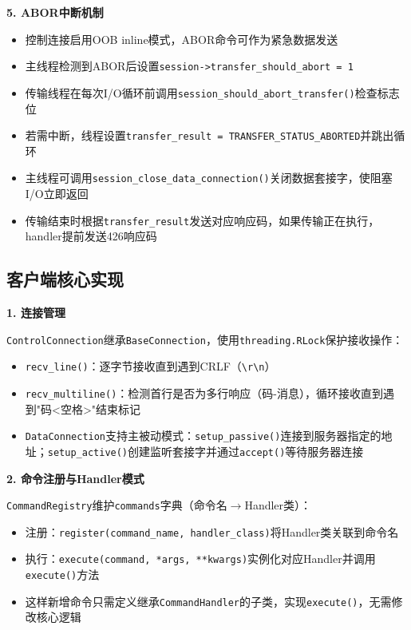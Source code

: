 \documentclass[11pt,a4paper]{article}
\begin{document}
\textbf{5. ABOR中断机制}

\begin{itemize}[itemsep=0pt]
    \item 控制连接启用OOB inline模式，ABOR命令可作为紧急数据发送
    \item 主线程检测到ABOR后设置\texttt{session->transfer\_should\_abort = 1}
    \item 传输线程在每次I/O循环前调用\texttt{session\_should\_abort\_transfer()}检查标志位
    \item 若需中断，线程设置\texttt{transfer\_result = TRANSFER\_STATUS\_ABORTED}并跳出循环
    \item 主线程可调用\texttt{session\_close\_data\_connection()}关闭数据套接字，使阻塞I/O立即返回
    \item 传输结束时根据\texttt{transfer\_result}发送对应响应码，如果传输正在执行，handler提前发送426响应码
\end{itemize}

\subsection{客户端核心实现}

\textbf{1. 连接管理}

\texttt{ControlConnection}继承\texttt{BaseConnection}，使用\texttt{threading.RLock}保护接收操作：
\begin{itemize}[itemsep=0pt]
    \item \texttt{recv\_line()}：逐字节接收直到遇到CRLF（\texttt{\textbackslash r\textbackslash n}）
    \item \texttt{recv\_multiline()}：检测首行是否为多行响应（码-消息），循环接收直到遇到"码<空格>"结束标记
    \item \texttt{DataConnection}支持主被动模式：\texttt{setup\_passive()}连接到服务器指定的地址；\texttt{setup\_active()}创建监听套接字并通过\texttt{accept()}等待服务器连接
\end{itemize}

\textbf{2. 命令注册与Handler模式}

\texttt{CommandRegistry}维护\texttt{commands}字典（命令名$\rightarrow$Handler类）：
\begin{itemize}[itemsep=0pt]
    \item 注册：\texttt{register(command\_name, handler\_class)}将Handler类关联到命令名
    \item 执行：\texttt{execute(command, *args, **kwargs)}实例化对应Handler并调用\texttt{execute()}方法
    \item 这样新增命令只需定义继承\texttt{CommandHandler}的子类，实现\texttt{execute()}，无需修改核心逻辑
\end{itemize}
\end{document}
